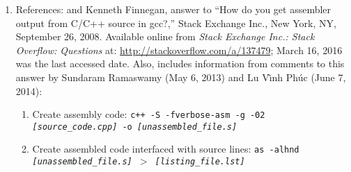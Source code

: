 \begin{enumerate}
\begin{enumerate}
\begin{enumerate}
		\item To view the source file: {\tt cat {\it [source\_file]}}
		\item To remove all symbol table and relocation information from the executable, the executable for that source file becomes: {\tt gcc -s {\it [source\_file.c]}}: \vspace{-0.1cm}
			\begin{enumerate} \itemsep -1pt
			\item Or, try: {\tt gcc -S {\it [source\_file.c]}}
			\item Alternatively, try: {\tt strip {\it [source\_file]}}
			\item {\tt gcc -g {\it [source\_file.c]}} adds debugging information to the executable.
			\end{enumerate}
		\item If access to source files is unavailable, but access to the object file is available, use: {\tt objdump -S --disassemble {\it [object\_file]} $>$ {\it [object\_file.dump]}}. Use {\tt file {\it [object\_file]}} to determine if I can get enough information from the object file.: \vspace{-0.1cm}
			\begin{enumerate} \itemsep -1pt
			\item {\tt gcc -S -o {\it [unassembled\_file.s]} {\it [source\_file.c]}}
			\item To view the output file from {\tt gcc -S}: {\tt cat {\it [source\_file]}}
			\end{enumerate}
		\end{enumerate}
	\item References: \cite[pp. 3, or pp. 15 in the PDF]{Arndt2010} and Kenneth Finnegan, answer to ``How do you get assembler output from C/C++ source in gcc?,'' Stack Exchange Inc., New York, NY, September 26, 2008. Available online from {\it Stack Exchange Inc.: Stack Overflow: Questions} at: \url{http://stackoverflow.com/a/137479}; March 16, 2016 was the last accessed date. Also, includes information from comments to this answer by Sundaram Ramaswamy (May 6, 2013) and L{\uhorn}u V{\~{\i}}nh Ph{\'{u}}c (June 7, 2014): \vspace{-0.2cm}
		\begin{enumerate} \itemsep -2pt
		\item Create assembly code: {\tt c++ -S -fverbose-asm -g -02 {\it [source\_code.cpp]} -o {\it [unassembled\_file.s]}}
		\item Create assembled code interfaced with source lines: {\tt as -alhnd {\it [unassembled\_file.s]} $>$ {\it [listing\_file.lst]}} 

\end{enumerate}
\end{enumerate}
\end{enumerate}
